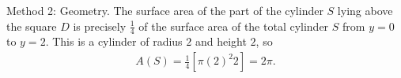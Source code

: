 {Method 2: Geometry. The surface area of the part of the cylinder $S$ lying above the square $D$ is precisely $\frac{1}{4}$ of the surface area of the total cylinder $S$ from $y = 0$ to $y = 2$. This is a cylinder of radius $2$ and height $2$, so
\begin{align*}
A(S)
=
\frac{1}{4} \left[\pi (2)^{2} 2\right]
=
2 \pi.
\end{align*}
}%